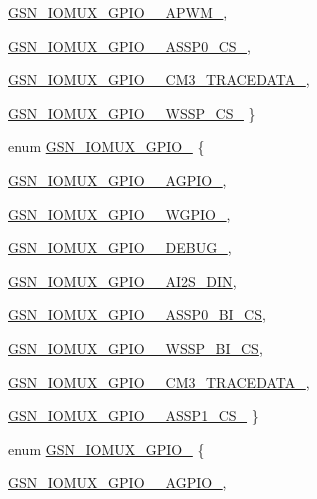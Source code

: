 \begin{DoxyCompactItemize}
\hyperlink{a00519_a7fb4ec9b8fae8563ec4216544475854dac5cb093e7396444c75b520c82fdd2cda}{GSN\_\-IOMUX\_\-GPIO\_\_\-APWM\_}, 
\par
\hyperlink{a00519_a7fb4ec9b8fae8563ec4216544475854da1d65dea6e67d0ab3a6ddad3f19a24ea4}{GSN\_\-IOMUX\_\-GPIO\_\_\-ASSP0\_\-CS\_}, 
\par
\hyperlink{a00519_a7fb4ec9b8fae8563ec4216544475854da11fcf8d265994f0f13a8139da5ec0d4f}{GSN\_\-IOMUX\_\-GPIO\_\_\-CM3\_\-TRACEDATA\_}, 
\par
\hyperlink{a00519_a7fb4ec9b8fae8563ec4216544475854dacb866d05a9ac033eee1aa2d64d26f620}{GSN\_\-IOMUX\_\-GPIO\_\_\-WSSP\_\-CS\_}
 \}
\item 
enum \hyperlink{a00519_add13f1a7b2158125a72480380aae7651}{GSN\_\-IOMUX\_\-GPIO\_} \{ \par
\hyperlink{a00519_add13f1a7b2158125a72480380aae7651a73e3a87ea11a126a0549a468538977a6}{GSN\_\-IOMUX\_\-GPIO\_\_\-AGPIO\_}, 
\par
\hyperlink{a00519_add13f1a7b2158125a72480380aae7651a0cc9c3819bf8c1cd39f0dd5585d4069d}{GSN\_\-IOMUX\_\-GPIO\_\_\-WGPIO\_}, 
\par
\hyperlink{a00519_add13f1a7b2158125a72480380aae7651ab2369c48342ec3fd2ce033ef816e7f41}{GSN\_\-IOMUX\_\-GPIO\_\_\-DEBUG\_}, 
\par
\hyperlink{a00519_add13f1a7b2158125a72480380aae7651ab1d1a62e582509aaab4fff428a4c2cf3}{GSN\_\-IOMUX\_\-GPIO\_\_\-AI2S\_\-DIN}, 
\par
\hyperlink{a00519_add13f1a7b2158125a72480380aae7651ab2ad4faf16de6596aace8f2bc4d1c081}{GSN\_\-IOMUX\_\-GPIO\_\_\-ASSP0\_\-BI\_\-CS}, 
\par
\hyperlink{a00519_add13f1a7b2158125a72480380aae7651a72bdd7046b8a4eae3d2e6a3af2b994fa}{GSN\_\-IOMUX\_\-GPIO\_\_\-WSSP\_\-BI\_\-CS}, 
\par
\hyperlink{a00519_add13f1a7b2158125a72480380aae7651adcff5fe8e83e8244d36fa372416d8edb}{GSN\_\-IOMUX\_\-GPIO\_\_\-CM3\_\-TRACEDATA\_}, 
\par
\hyperlink{a00519_add13f1a7b2158125a72480380aae7651a30770b8c8662fc74aaaac89d0ce12184}{GSN\_\-IOMUX\_\-GPIO\_\_\-ASSP1\_\-CS\_}
 \}
\item 
enum \hyperlink{a00519_a75355127354ab0ecdc012bd92dab342f}{GSN\_\-IOMUX\_\-GPIO\_} \{ \par
\hyperlink{a00519_a75355127354ab0ecdc012bd92dab342fa6fa7ab03c114d6450512b84c51fe5a6d}{GSN\_\-IOMUX\_\-GPIO\_\_\-AGPIO\_}, 
\par

\end{DoxyCompactItemize}
